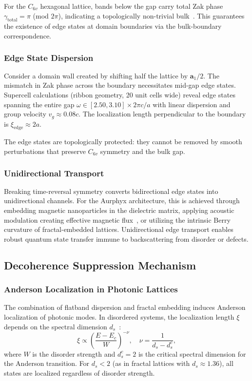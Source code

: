 For the $C_{6v}$ hexagonal lattice, bands below the gap carry total Zak phase $\gamma_{\mathrm{total}} = \pi$ (mod $2\pi$), indicating a topologically non-trivial bulk~\cite{Xiao2014}. This guarantees the existence of edge states at domain boundaries via the bulk-boundary correspondence.

\subsubsection{Edge State Dispersion}

Consider a domain wall created by shifting half the lattice by $\mathbf{a}_1/2$. The mismatch in Zak phase across the boundary necessitates mid-gap edge states. Supercell calculations (ribbon geometry, 20 unit cells wide) reveal edge states spanning the entire gap $\omega \in [2.50, 3.10] \times 2\pi c/a$ with linear dispersion and group velocity $v_g \approx 0.08c$. The localization length perpendicular to the boundary is $\xi_{\mathrm{edge}} \approx 2a$.

The edge states are topologically protected: they cannot be removed by smooth perturbations that preserve $C_{6v}$ symmetry and the bulk gap.

\subsubsection{Unidirectional Transport}

Breaking time-reversal symmetry converts bidirectional edge states into unidirectional channels. For the Aurphyx architecture, this is achieved through embedding magnetic nanoparticles in the dielectric matrix, applying acoustic modulation creating effective magnetic flux~\cite{Rechtsman2013}, or utilizing the intrinsic Berry curvature of fractal-embedded lattices. Unidirectional edge transport enables robust quantum state transfer immune to backscattering from disorder or defects.

\subsection{Decoherence Suppression Mechanism}

\subsubsection{Anderson Localization in Photonic Lattices}

The combination of flatband dispersion and fractal embedding induces Anderson localization of photonic modes. In disordered systems, the localization length $\xi$ depends on the spectral dimension $d_s$~\cite{Anderson1958,Kramer1993}:
\begin{equation}
\xi \propto \left( \frac{E - E_c}{W} \right)^{-\nu}, \quad \nu = \frac{1}{d_s - d_s^c},
\label{eq:loc_length}
\end{equation}
where $W$ is the disorder strength and $d_s^c = 2$ is the critical spectral dimension for the Anderson transition. For $d_s < 2$ (as in fractal lattices with $d_s \approx 1.36$), all states are localized regardless of disorder strength.

